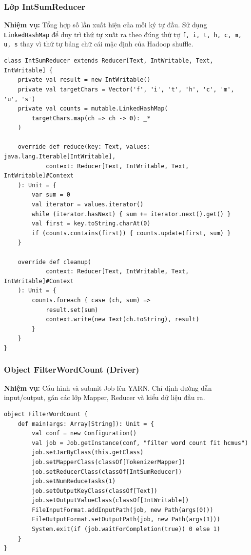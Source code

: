 \subsubsection{Lớp IntSumReducer}

\textbf{Nhiệm vụ:} Tổng hợp số lần xuất hiện của mỗi ký tự đầu. Sử dụng \texttt{LinkedHashMap} để duy trì thứ tự xuất ra theo đúng thứ tự \texttt{f, i, t, h, c, m, u, s} thay vì thứ tự bảng chữ cái mặc định của Hadoop shuffle.

\begin{lstlisting}[style=scalastyle, caption={Lớp IntSumReducer --- gom cụm và duy trì thứ tự xuất ra}]
class IntSumReducer extends Reducer[Text, IntWritable, Text, IntWritable] {
    private val result = new IntWritable()
    private val targetChars = Vector('f', 'i', 't', 'h', 'c', 'm', 'u', 's')
    private val counts = mutable.LinkedHashMap(
        targetChars.map(ch => ch -> 0): _*
    )

    override def reduce(key: Text, values: java.lang.Iterable[IntWritable],
            context: Reducer[Text, IntWritable, Text, IntWritable]#Context
    ): Unit = {
        var sum = 0
        val iterator = values.iterator()
        while (iterator.hasNext) { sum += iterator.next().get() }
        val first = key.toString.charAt(0)
        if (counts.contains(first)) { counts.update(first, sum) }
    }

    override def cleanup(
            context: Reducer[Text, IntWritable, Text, IntWritable]#Context
    ): Unit = {
        counts.foreach { case (ch, sum) =>
            result.set(sum)
            context.write(new Text(ch.toString), result)
        }
    }
}
\end{lstlisting}

\subsubsection{Object FilterWordCount (Driver)}

\textbf{Nhiệm vụ:} Cấu hình và submit Job lên YARN. Chỉ định đường dẫn input/output, gán các lớp Mapper, Reducer và kiểu dữ liệu đầu ra.

\begin{lstlisting}[style=scalastyle, caption={Driver --- cấu hình và submit MapReduce Job lên YARN}]
object FilterWordCount {
    def main(args: Array[String]): Unit = {
        val conf = new Configuration()
        val job = Job.getInstance(conf, "filter word count fit hcmus")
        job.setJarByClass(this.getClass)
        job.setMapperClass(classOf[TokenizerMapper])
        job.setReducerClass(classOf[IntSumReducer])
        job.setNumReduceTasks(1)
        job.setOutputKeyClass(classOf[Text])
        job.setOutputValueClass(classOf[IntWritable])
        FileInputFormat.addInputPath(job, new Path(args(0)))
        FileOutputFormat.setOutputPath(job, new Path(args(1)))
        System.exit(if (job.waitForCompletion(true)) 0 else 1)
    }
}
\end{lstlisting}

